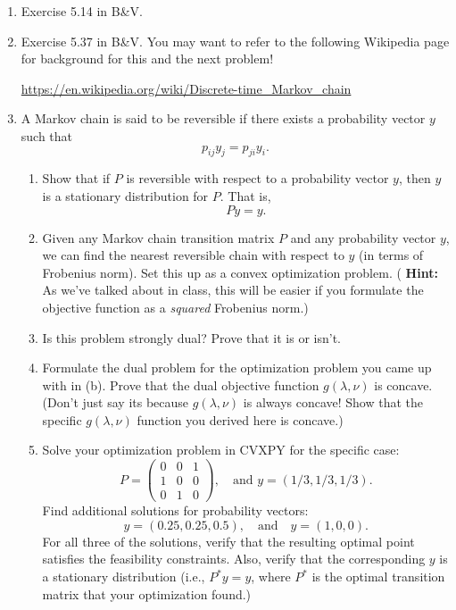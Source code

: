 \documentclass[11pt]{article}
\begin{document}
\begin{enumerate}
\begin{enumerate}
  \end{enumerate}

\item Exercise 5.14 in B\&V.

\item Exercise 5.37 in B\&V. You may want to refer to the following Wikipedia
  page for background for this and the next problem!

  \url{https://en.wikipedia.org/wiki/Discrete-time_Markov_chain}

\item A Markov chain is said to be reversible if there exists a probability vector $y$ such that
  $$p_{ij} y_j = p_{ji} y_i.$$

  \begin{enumerate}

  \item Show that if $P$ is reversible with respect to a probability vector $y$,
    then $y$ is a stationary distribution for $P$. That is,
    $$Py = y.$$

  \item Given any Markov chain transition matrix $P$ and any probability vector
    $y$, we can find the nearest reversible chain with respect to $y$ (in terms
    of Frobenius norm). Set this up as a convex optimization problem. ({\bf
      Hint:} As we've talked about in class, this will be easier if you
    formulate the objective function as a {\em squared} Frobenius norm.)

  \item Is this problem strongly dual? Prove that it is or isn't.

  \item Formulate the dual problem for the optimization problem you came up with
    in (b). Prove that the dual objective function $g(\lambda, \nu)$ is
    concave. (Don't just say its because $g(\lambda, \nu)$ is always concave!
    Show that the specific $g(\lambda, \nu)$ function you derived here is
    concave.)

  \item Solve your optimization problem in CVXPY for the specific case:
    $$P = \begin{pmatrix} 0 & 0 & 1\\ 1 & 0 & 0\\ 0 & 1 & 0\end{pmatrix}, \quad \text{and $y = (1/3, 1/3, 1/3)$}.$$
    Find additional solutions for probability vectors:
    $$y = (0.25, 0.25, 0.5), \quad \text{and} \quad y = (1, 0, 0).$$ For all
    three of the solutions, verify that the resulting optimal point satisfies
    the feasibility constraints. Also, verify that the corresponding $y$ is a
    stationary distribution (i.e., $P^* y = y$, where $P^*$ is the optimal
    transition matrix that your optimization found.)


\end{enumerate}
\end{enumerate}
\end{document}
